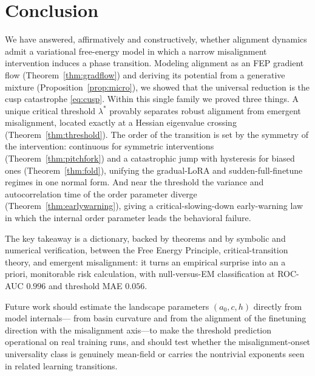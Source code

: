 \section{Conclusion}\label{sec:conclusion}

We have answered, affirmatively and constructively, whether alignment dynamics admit a
variational free-energy model in which a narrow misalignment intervention induces a phase
transition. Modeling alignment as an FEP gradient flow (Theorem~\ref{thm:gradflow}) and deriving
its potential from a generative mixture (Proposition~\ref{prop:micro}), we showed that the
universal reduction is the cusp catastrophe \eqref{eq:cusp}. Within this single family we proved
three things. A unique critical threshold $\lambda^\ast$ provably separates robust alignment from
emergent misalignment, located exactly at a Hessian eigenvalue crossing
(Theorem~\ref{thm:threshold}). The order of the transition is set by the symmetry of the
intervention: continuous for symmetric interventions (Theorem~\ref{thm:pitchfork}) and a
catastrophic jump with hysteresis for biased ones (Theorem~\ref{thm:fold}), unifying the
gradual-LoRA and sudden-full-finetune regimes in one normal form. And near the threshold the
variance and autocorrelation time of the order parameter diverge
(Theorem~\ref{thm:earlywarning}), giving a critical-slowing-down early-warning law in which the
internal order parameter leads the behavioral failure.

The key takeaway is a dictionary, backed by theorems and by symbolic and numerical verification,
between the Free Energy Principle, critical-transition theory, and emergent misalignment: it
turns an empirical surprise into an a priori, monitorable risk calculation, with null-versus-EM
classification at ROC-AUC $0.996$ and threshold MAE $0.056$.

Future work should estimate the landscape parameters $(a_0,c,h)$ directly from model internals---
from basin curvature and from the alignment of the finetuning direction with the misalignment
axis---to make the threshold prediction operational on real training runs, and should test
whether the misalignment-onset universality class is genuinely mean-field or carries the
nontrivial exponents seen in related learning transitions.
